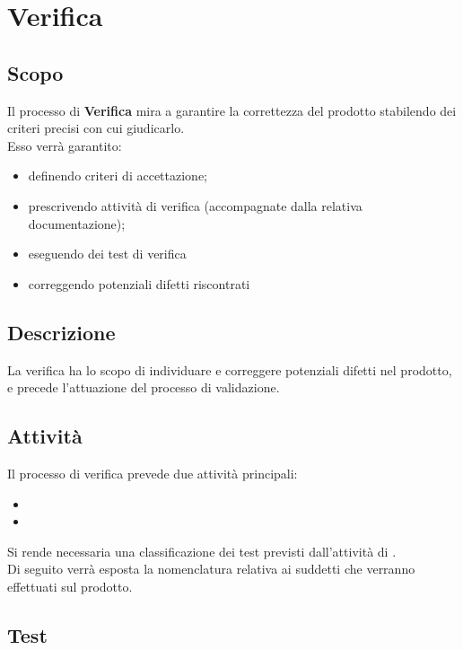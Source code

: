 \section{Verifica}
		\subsection{Scopo}
		Il processo di \textbf{Verifica} mira a garantire la correttezza del prodotto stabilendo dei criteri precisi con cui giudicarlo. \\ Esso verrà garantito:
		\begin{itemize}
			\item definendo criteri di accettazione;
			\item prescrivendo attività di verifica (accompagnate dalla relativa documentazione);
			\item eseguendo dei test di verifica
			\item correggendo potenziali difetti riscontrati
		\end{itemize}

		\subsection{Descrizione}
		La verifica ha lo scopo di individuare e correggere potenziali difetti nel prodotto, e precede l'attuazione del processo di validazione.
		
		\subsection{Attività}
		Il processo di verifica prevede due attività principali:
		\begin{itemize}
			\item {}
			\item {}
		\end{itemize}
		
		Si rende necessaria una classificazione dei test previsti dall'attività di .\\ Di seguito verrà esposta la nomenclatura relativa ai suddetti  che verranno effettuati sul prodotto.
		
		\subsection{Test}
		
